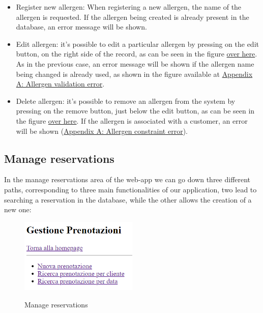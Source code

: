 \documentclass{article}
\begin{document}
    \begin{itemize}

        \item Register new allergen: When registering a new allergen, the name of the allergen is requested. If the allergen being created is already present in the database, an error message will be shown.

        \item Edit allergen: it's possible
        to edit a particular allergen by pressing on the edit button, on the right side of the record, as can be seen in the figure \hyperref[fig:allergens_overview]{over here}. As in the previous case, an error message will be shown if the allergen name being changed is already used, as shown in the figure available at \hyperref[fig:allergen_validation_error]{Appendix A: Allergen validation error}.

        \item Delete allergen: it's possible
        to remove an allergen from the system by pressing on the remove button, just below the edit button, as can be seen in the figure \hyperref[fig:allergens_overview]{over here}. If the allergen is associated with a customer, an error will be shown (\hyperref[fig:allergen_constraint_error]{Appendix A: Allergen constraint error}).

    \end{itemize}

\newpage
    \subsection*{Manage reservations}
    In the manage reservations area of the web-app we can go down three 
    different paths, corresponding to three main functionalities of 
    our application, two lead to searching a reservation in the 
    database, while the other allows the creation of a new one:
    
    \vspace{5mm}
        \begin{figure}[H]
        \centering
        \includegraphics[width=0.5\textwidth]{images/manage_reservations}
        \label{fig:search_reservation_by_customer_errors}
        \caption{Manage reservations}
    \end{figure}
    \vspace{5mm}
    
\end{document}
